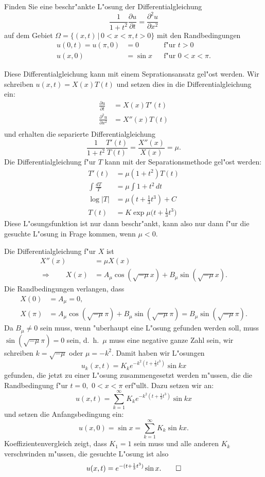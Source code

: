 Finden Sie eine beschr"ankte L"osung der Differentialgleichung
\begin{equation}
\frac1{1+t^2}\frac{\partial u}{\partial t}=\frac{\partial^2 u}{\partial x^2}
\label{40000010:dgl}
\end{equation}
auf dem Gebiet $\Omega=\{(x,t)\,|\, 0<x<\pi,t>0\}$ 
mit den Randbedingungen
\begin{align*}
u(0,t)=u(\pi,0)&=0&&\text{f"ur $t > 0$}\\
u(x,0)&=\sin x&&\text{f"ur $0<x<\pi$}.
\end{align*}

\begin{loesung}
Diese Differentialgleichung kann mit einem Seprationsansatz gel"ost werden.
Wir schreiben $u(x,t)=X(x)T(t)$ und setzen dies in die Differentialgleichung
ein:
\begin{align*}
\frac{\partial u}{\partial t}&=X(x)T'(t)\\
\frac{\partial^2 u}{\partial x^2}&=X''(x)T(t)\\
\end{align*}
und erhalten die separierte Differentialgleichung
\[
\frac1{1+t^2}\frac{T'(t)}{T(t)}=\frac{X''(x)}{X(x)}=\mu.
\]
Die Differentialgleichung f"ur $T$ kann mit der Separationsmethode
gel"ost werden:
\begin{align*}
T'(t)&=\mu (1+t^2)T(t)\\
\int\frac{dT}{T}&=\mu\int 1+t^2\,dt\\
\log|T|&=\mu(t+\frac13t^3) +C\\
T(t)&=K\exp\mu\biggl(t+\frac13t^3\biggr)
\end{align*}
Diese L"osungsfunktion ist nur dann beschr"ankt, kann also nur dann
f"ur die gesuchte L"osung in Frage kommen, wenn $\mu <0$.

Die Differentialgleichung f"ur $X$ ist
\begin{align*}
X''(x)&=\mu X(x)\\
\Rightarrow\qquad
X(x)&=A_\mu \cos(\sqrt{-\mu}x) + B_\mu\sin(\sqrt{-\mu}x).
\end{align*}
Die Randbedingungen verlangen, dass
\begin{align*}
X(0)&=A_\mu=0,\\
X(\pi)&=A_\mu\cos(\sqrt{-\mu}\pi)+B_\mu\sin(\sqrt{-\mu}\pi)=B_\mu\sin(\sqrt{-\mu}\pi).
\end{align*}
Da $B_\mu\ne 0$ sein muss, wenn "uberhaupt eine L"osung gefunden werden
soll, muss $\sin(\sqrt{-\mu}\pi)=0$ sein, d.~h.~$\mu$ muss eine negative ganze
Zahl sein, wir schreiben $k=\sqrt{-\mu}$ oder $\mu=-k^2$.
Damit haben wir L"osungen
\[
u_k(x,t)=K_k e^{-k^2(t+\frac13t^3)}\sin kx
\]
gefunden, die jetzt zu einer L"osung zusammengesetzt werden m"ussen, die
die Randbedingung f"ur $t=0,$ $0<x<\pi$ erf"ullt. Dazu setzen wir an:
\[
u(x,t)=\sum_{k=1}^\infty K_k e^{-k^2(t+\frac13t^3)}\sin kx
\]
und setzen die Anfangsbedingung ein:
\[
u(x,0)=\sin x=\sum_{k=1}^\infty K_k \sin kx.
\]
Koeffizientenvergleich zeigt, dass $K_1=1$ sein muss und alle anderen $K_k$
verschwinden m"ussen, die gesuchte L"osung ist also
\[
u(x,t)=e^{-(t+\frac13t^3)}\sin x.
\qedhere
\]
\end{loesung}

